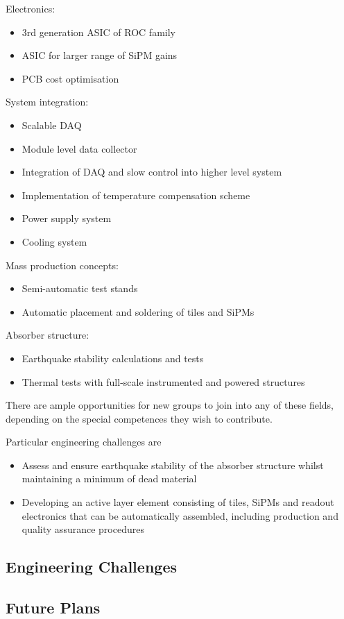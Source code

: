 Electronics:
\begin{itemize}
\item 3rd generation ASIC of ROC family
\item ASIC for larger range of SiPM gains
\item PCB cost optimisation
\end{itemize}

System integration:
\begin{itemize}
\item Scalable DAQ
\item Module level data collector
\item Integration of DAQ and slow control into higher level system
\item Implementation of temperature compensation scheme
\item Power supply system
\item Cooling system
\end{itemize}

Mass production concepts:
\begin{itemize}
\item Semi-automatic test stands
\item Automatic placement and soldering of tiles and SiPMs
\end{itemize}

Absorber structure:
\begin{itemize}
\item Earthquake stability calculations and tests
\item Thermal tests with full-scale instrumented and powered structures
\end{itemize}

There are ample opportunities for new groups to join into any of these fields, depending on the special competences they wish to contribute.

Particular engineering challenges are
\begin{itemize}
\item Assess and ensure earthquake stability of the absorber structure whilst maintaining a minimum of dead material
\item Developing an active layer element consisting of tiles, SiPMs and readout electronics that can be automatically assembled, including production and quality assurance procedures
\end{itemize}

\subsection{Engineering Challenges}
\subsection{Future Plans}
